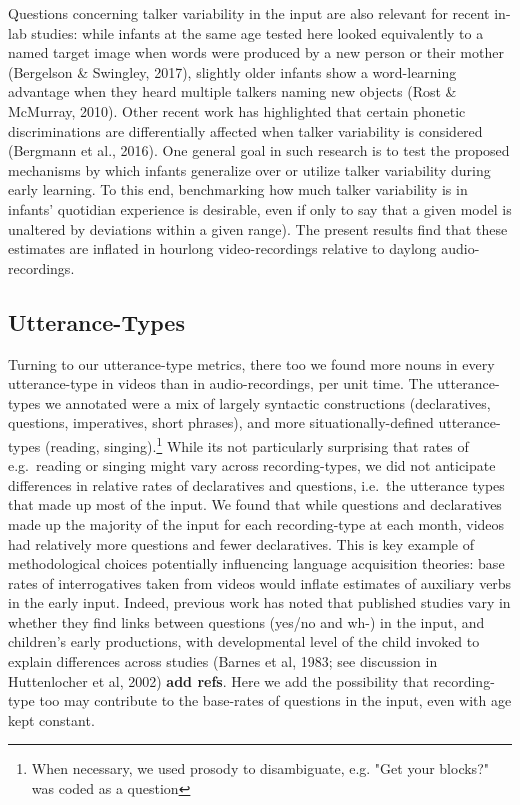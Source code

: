\documentclass[floatsintext,man]{apa6}
\theoremstyle{definition}
\theoremstyle{definition}
\theoremstyle{definition}
\theoremstyle{remark}
\begin{document}
Questions concerning talker variability in the input are also relevant
for recent in-lab studies: while infants at the same age tested here
looked equivalently to a named target image when words were produced by
a new person or their mother (Bergelson \& Swingley, 2017), slightly
older infants show a word-learning advantage when they heard multiple
talkers naming new objects (Rost \& McMurray, 2010). Other recent work
has highlighted that certain phonetic discriminations are differentially
affected when talker variability is considered (Bergmann et al., 2016).
One general goal in such research is to test the proposed mechanisms by
which infants generalize over or utilize talker variability during early
learning. To this end, benchmarking how much talker variability is in
infants' quotidian experience is desirable, even if only to say that a
given model is unaltered by deviations within a given range). The
present results find that these estimates are inflated in hourlong
video-recordings relative to daylong audio-recordings.

\subsection{Utterance-Types}\label{utterance-types}

Turning to our utterance-type metrics, there too we found more nouns in
every utterance-type in videos than in audio-recordings, per unit time.
The utterance-types we annotated were a mix of largely syntactic
constructions (declaratives, questions, imperatives, short phrases), and
more situationally-defined utterance-types (reading,
singing).\footnote{When necessary, we used prosody to disambiguate, e.g. "Get your blocks?" was coded as a question}
While its not particularly surprising that rates of e.g.~reading or
singing might vary across recording-types, we did not anticipate
differences in relative rates of declaratives and questions, i.e.~the
utterance types that made up most of the input. We found that while
questions and declaratives made up the majority of the input for each
recording-type at each month, videos had relatively more questions and
fewer declaratives. This is key example of methodological choices
potentially influencing language acquisition theories: base rates of
interrogatives taken from videos would inflate estimates of auxiliary
verbs in the early input. Indeed, previous work has noted that published
studies vary in whether they find links between questions (yes/no and
wh-) in the input, and children's early productions, with developmental
level of the child invoked to explain differences across studies (Barnes
et al, 1983; see discussion in Huttenlocher et al, 2002) \textbf{add
refs}. Here we add the possibility that recording-type too may
contribute to the base-rates of questions in the input, even with age
kept constant.
\end{document}
